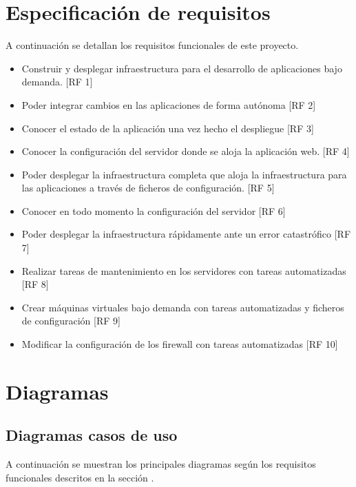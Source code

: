 \section{Especificación de requisitos}
	\label{erf}
	\begin{paragraph}
		A continuación se detallan los requisitos funcionales de este proyecto. 
		\begin{itemize}
			\item Construir y desplegar infraestructura para el desarrollo de aplicaciones bajo demanda. [RF 1]
			\item Poder integrar cambios en las aplicaciones de forma autónoma [RF 2]
			\item Conocer el estado de la aplicación una vez hecho el despliegue [RF 3]
			\item Conocer la configuración del servidor donde se aloja la aplicación web. [RF 4]
			\item Poder desplegar la infraestructura completa que aloja la infraestructura para las aplicaciones a través de ficheros de configuración. [RF 5]
			\item Conocer en todo momento la configuración del servidor [RF 6]
			\item Poder desplegar la infraestructura rápidamente ante un error catastrófico [RF 7]
			\item Realizar tareas de mantenimiento en los servidores con tareas automatizadas [RF 8]
			\item Crear máquinas virtuales bajo demanda con tareas automatizadas y ficheros de configuración [RF 9]
			\item Modificar la configuración de los firewall con tareas automatizadas [RF 10]
		\end{itemize}
	\end{paragraph}

\section{Diagramas}
	\subsection{Diagramas casos de uso}
		\begin{paragraph}
			A continuación se muestran los principales diagramas según los requisitos funcionales descritos en la sección .
		\end{paragraph}
	
